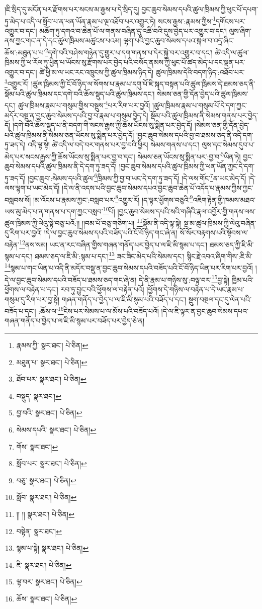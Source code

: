 །ཇི་སྲིད་དུ་མངོན་པར་རྫོགས་པར་སངས་མ་རྒྱས་པ་དེ་སྲིད་དུ། བྱང་ཆུབ་སེམས་དཔའི་ཚུལ་ཁྲིམས་ཀྱི་ཕུང་པོ་དཔག་ཏུ་མེད་པ་འདི་ལ་སློབ་པ་ན་ཕན་ཡོན་རྣམ་པ་ལྔ་འཐོབ་པར་འགྱུར་ཏེ། སངས་རྒྱས་:རྣམས་ཀྱིས་\footnote{རྣམས་ཀྱི་  སྣར་ཐང་།  པེ་ཅིན། }དགོངས་པར་འགྱུར་བ་དང་། མཆོག་ཏུ་དགའ་བ་ཆེན་པོ་ལ་གནས་བཞིན་དུ་འཆི་བའི་དུས་བྱེད་པར་འགྱུར་བ་དང་། ལུས་ཞིག་ནས་ཀྱང་གང་ན་དེ་དང་ཚུལ་ཁྲིམས་མཚུངས་པའམ། ལྷག་པའི་བྱང་ཆུབ་སེམས་དཔའ་སྐལ་བ་འདྲ་ཞིང་ཆོས་:མཐུན་པ་པ་\footnote{མཐུན་པ་  སྣར་ཐང་།  པེ་ཅིན། }དགེ་བའི་བཤེས་གཉེན་དུ་གྱུར་པ་དག་གནས་པ་དེར་སྐྱེ་བར་འགྱུར་བ་དང་། ཚེ་འདི་ལ་ཚུལ་ཁྲིམས་ཀྱི་ཕ་རོལ་ཏུ་ཕྱིན་པ་ཡོངས་སུ་རྫོགས་པར་བྱེད་པའི་བསོད་ནམས་ཀྱི་ཕུང་པོ་ཚད་མེད་པ་དང་ལྡན་པར་འགྱུར་བ་དང་། ཚེ་ཕྱི་མ་ལ་ཡང་རང་འཁྲུངས་ཀྱི་ཚུལ་ཁྲིམས་ཉིད་དེ། ཚུལ་ཁྲིམས་དེའི་བདག་ཉིད་:འཐོབ་པར་\footnote{ཐོབ་པར་  སྣར་ཐང་།  པེ་ཅིན། }འགྱུར་རོ། །ཚུལ་ཁྲིམས་ཀྱི་ངོ་བོ་ཉིད་ལ་སོགས་པ་རྣམ་པ་དགུ་པོ་ཇི་སྐད་བསྟན་པའི་ཚུལ་ཁྲིམས་དེ་ཐམས་ཅད་ནི་སྡོམ་པའི་ཚུལ་ཁྲིམས་དང་དགེ་བའི་ཆོས་སྡུད་པའི་ཚུལ་ཁྲིམས་དང་། སེམས་ཅན་གྱི་དོན་བྱེད་པའི་ཚུལ་ཁྲིམས་དང་། ཚུལ་ཁྲིམས་རྣམ་པ་གསུམ་གྱིས་བསྡུས་\footnote{བསྡུད་  སྣར་ཐང་། }པར་རིག་པར་བྱའོ། །ཚུལ་ཁྲིམས་རྣམ་པ་གསུམ་པོ་དེ་དག་ཀྱང་མདོར་བསྡུ་ན་བྱང་ཆུབ་སེམས་དཔའི་བྱ་བ་རྣམ་པ་གསུམ་བྱེད་དེ། སྡོམ་པའི་ཚུལ་ཁྲིམས་ནི་སེམས་གནས་པར་བྱེད་དོ། །དགེ་བའི་ཆོས་སྡུད་པ་ནི་བདག་གི་སངས་རྒྱས་ཀྱི་ཆོས་ཡོངས་སུ་སྨིན་པར་བྱེད་དོ། །སེམས་ཅན་གྱི་དོན་བྱེད་པའི་ཚུལ་ཁྲིམས་ནི་སེམས་ཅན་ཡོངས་སུ་སྨིན་པར་བྱེད་དོ། །བྱང་ཆུབ་སེམས་དཔའི་བྱ་བ་ཐམས་ཅད་ནི་འདི་དག་ཏུ་ཟད་དེ། འདི་ལྟ་སྟེ། ཚེ་འདི་ལ་བདེ་བར་གནས་པར་བྱ་བའི་ཕྱིར། སེམས་གནས་པ་དང་། ལུས་དང་སེམས་དུབ་པ་མེད་པར་སངས་རྒྱས་ཀྱི་ཆོས་ཡོངས་སུ་སྨིན་པར་བྱ་བ་དང་། སེམས་ཅན་ཡོངས་སུ་སྨིན་པར་:བྱ་བ་\footnote{བྱ་བའི་  སྣར་ཐང་།  པེ་ཅིན། }ཡིན་ཏེ། བྱང་ཆུབ་སེམས་དཔའི་ཚུལ་ཁྲིམས་ནི་དེ་དག་ཏུ་ཟད་དོ། །བྱང་ཆུབ་སེམས་དཔའི་ཚུལ་ཁྲིམས་ཀྱི་ཕན་ཡོན་ཀྱང་དེ་དག་ཏུ་ཟད་དོ། །བྱང་ཆུབ་:སེམས་དཔའི་ཚུལ་\footnote{སེམས་དཔའི་  སྣར་ཐང་།  པེ་ཅིན། }ཁྲིམས་ཀྱི་བྱ་བ་ཡང་དེ་དག་ཏུ་ཟད་དོ། །དེ་ལས་གོང་\footnote{གོས་  སྣར་ཐང་། }ན་ཡང་མེད་དོ། །དེ་ལས་ལྷག་པ་ཡང་མེད་དོ། །དེ་ལ་ནི་འདས་པའི་བྱང་ཆུབ་སེམས་དཔའ་བྱང་ཆུབ་ཆེན་པོ་འདོད་པ་རྣམས་ཀྱིས་ཀྱང་བསླབས་སོ། །མ་འོངས་པ་རྣམས་ཀྱང་:བསླབ་པར་\footnote{སློབ་པར་  སྣར་ཐང་།  པེ་ཅིན། }འགྱུར་རོ། །ད་ལྟར་ཕྱོགས་བཅུའི་\footnote{བཅུ་  སྣར་ཐང་།  པེ་ཅིན། }འཇིག་རྟེན་གྱི་ཁམས་མཐའ་ཡས་མུ་མེད་པ་ན་གནས་པ་དག་ཀྱང་བསླབ་\footnote{སློབ་  སྣར་ཐང་།  པེ་ཅིན། }པོ། །བྱང་ཆུབ་སེམས་དཔའི་སའི་གཞིའི་རྣལ་འབྱོར་གྱི་གནས་ལས་ཚུལ་ཁྲིམས་ཀྱི་ལེའུ་སྟེ་བཅུ་པའོ:།། །།བམ་པོ་བཅུ་གཅིག་པ། \footnote{།། །།   སྣར་ཐང་།  པེ་ཅིན། }སྡོམ་ནི་འདི་ལྟ་སྟེ། སྔ་མ་ཚུལ་ཁྲིམས་ཀྱི་ལེའུ་བཞིན་དུ་རིག་པར་བྱའོ། །དེ་ལ་བྱང་ཆུབ་སེམས་དཔའི་བཟོད་པའི་ངོ་བོ་ཉིད་གང་ཞེ་ན། སོ་སོར་བརྟགས་པའི་སྟོབས་ལ་བརྟེན་\footnote{བསྟེན་  སྣར་ཐང་། }ནས་སམ། ཡང་ན་རང་བཞིན་གྱིས་གཞན་གནོད་པར་བྱེད་པ་ལ་ཇི་མི་སྙམ་པ་དང་། ཐམས་ཅད་ཀྱི་ཇི་མི་སྙམ་པ་དང་། ཐམས་ཅད་ལ་ཇི་མི་:སྙམ་པ་དང་།\footnote{སྙམ་པ་སྟེ།  སྣར་ཐང་།  པེ་ཅིན། } ཟང་ཟིང་མེད་པའི་སེམས་དང་། སྙིང་རྗེ་འབའ་ཞིག་གིས་:ཇི་མི་\footnote{ཇི་  སྣར་ཐང་།  པེ་ཅིན། }སྙམ་པ་གང་ཡིན་པ་འདི་ནི་མདོར་བསྡུ་ན་བྱང་ཆུབ་སེམས་དཔའི་བཟོད་པའི་ངོ་བོ་ཉིད་ཡིན་པར་རིག་པར་བྱའོ། །དེ་ལ་བྱང་ཆུབ་སེམས་དཔའི་བཟོད་པ་ཐམས་ཅད་གང་ཞེ་ན། དེ་ནི་རྣམ་པ་གཉིས་སུ་:བལྟ་བར་\footnote{ལྟ་བར་  སྣར་ཐང་།  པེ་ཅིན། }བྱ་སྟེ། ཁྱིམ་པའི་ཕྱོགས་ལ་བརྟེན་པ་དང་། རབ་ཏུ་བྱུང་བའི་ཕྱོགས་ལ་བརྟེན་པའོ། །ཕྱོགས་དེ་གཉིས་ལ་བརྟེན་པ་དེ་ཡང་རྣམ་པ་གསུམ་དུ་རིག་པར་བྱ་སྟེ། གཞན་གནོད་པ་བྱེད་པ་ལ་ཇི་མི་སྙམ་པའི་བཟོད་པ་དང་། སྡུག་བསྔལ་དང་དུ་ལེན་པའི་བཟོད་པ་དང་། :ཆོས་ལ་\footnote{ཆོས་  སྣར་ཐང་།  པེ་ཅིན། }ངེས་པར་སེམས་པ་ལ་མོས་པའི་བཟོད་པའོ། །དེ་ལ་ཇི་ལྟར་ན་བྱང་ཆུབ་སེམས་དཔའ་གཞན་གནོད་པ་བྱེད་པ་ལ་ཇི་མི་སྙམ་པར་བཟོད་པར་བྱེད་ཅེ་ན། 